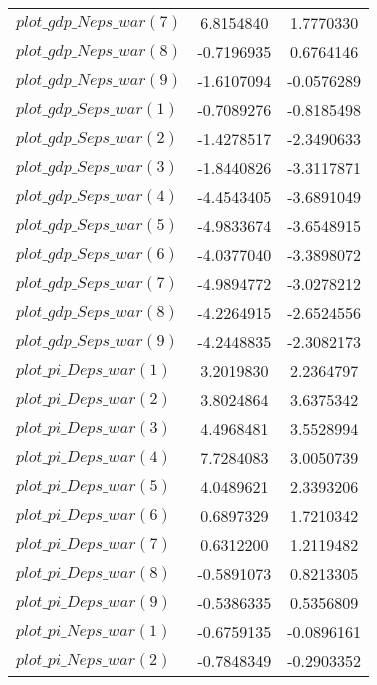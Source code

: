 \begin{center}
\begin{longtable}{lcc}
$plot\_gdp\_N eps\_war (7)  $	 & 	      6.8154840	 & 	      1.7770330 \\ 
$plot\_gdp\_N eps\_war (8)  $	 & 	     -0.7196935	 & 	      0.6764146 \\ 
$plot\_gdp\_N eps\_war (9)  $	 & 	     -1.6107094	 & 	     -0.0576289 \\ 
$plot\_gdp\_S eps\_war (1)  $	 & 	     -0.7089276	 & 	     -0.8185498 \\ 
$plot\_gdp\_S eps\_war (2)  $	 & 	     -1.4278517	 & 	     -2.3490633 \\ 
$plot\_gdp\_S eps\_war (3)  $	 & 	     -1.8440826	 & 	     -3.3117871 \\ 
$plot\_gdp\_S eps\_war (4)  $	 & 	     -4.4543405	 & 	     -3.6891049 \\ 
$plot\_gdp\_S eps\_war (5)  $	 & 	     -4.9833674	 & 	     -3.6548915 \\ 
$plot\_gdp\_S eps\_war (6)  $	 & 	     -4.0377040	 & 	     -3.3898072 \\ 
$plot\_gdp\_S eps\_war (7)  $	 & 	     -4.9894772	 & 	     -3.0278212 \\ 
$plot\_gdp\_S eps\_war (8)  $	 & 	     -4.2264915	 & 	     -2.6524556 \\ 
$plot\_gdp\_S eps\_war (9)  $	 & 	     -4.2448835	 & 	     -2.3082173 \\ 
$plot\_pi\_D eps\_war (1)   $	 & 	      3.2019830	 & 	      2.2364797 \\ 
$plot\_pi\_D eps\_war (2)   $	 & 	      3.8024864	 & 	      3.6375342 \\ 
$plot\_pi\_D eps\_war (3)   $	 & 	      4.4968481	 & 	      3.5528994 \\ 
$plot\_pi\_D eps\_war (4)   $	 & 	      7.7284083	 & 	      3.0050739 \\ 
$plot\_pi\_D eps\_war (5)   $	 & 	      4.0489621	 & 	      2.3393206 \\ 
$plot\_pi\_D eps\_war (6)   $	 & 	      0.6897329	 & 	      1.7210342 \\ 
$plot\_pi\_D eps\_war (7)   $	 & 	      0.6312200	 & 	      1.2119482 \\ 
$plot\_pi\_D eps\_war (8)   $	 & 	     -0.5891073	 & 	      0.8213305 \\ 
$plot\_pi\_D eps\_war (9)   $	 & 	     -0.5386335	 & 	      0.5356809 \\ 
$plot\_pi\_N eps\_war (1)   $	 & 	     -0.6759135	 & 	     -0.0896161 \\ 
$plot\_pi\_N eps\_war (2)   $	 & 	     -0.7848349	 & 	     -0.2903352 \\ 

\end{longtable}
\end{center}
